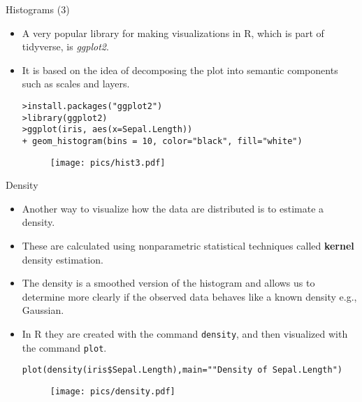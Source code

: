 \documentclass[handout]{beamer}
\begin{document}
\begin{frame}[fragile]{Histograms (3) }
\scriptsize{
\begin{itemize}
 \item A very popular library for making visualizations in R, which is part of tidyverse, is \emph{ggplot2}.
 \item It is based on the idea of decomposing the plot into semantic components such as scales and layers.
 \begin{verbatim}
>install.packages("ggplot2")
>library(ggplot2)
>ggplot(iris, aes(x=Sepal.Length)) 
+ geom_histogram(bins = 10, color="black", fill="white")
 \end{verbatim}
 \begin{figure}[h!]
	\centering
	\texttt{[image: pics/hist3.pdf]}
	
	
\end{figure} 

\end{itemize}

}
\end{frame}


\begin{frame}[fragile]{Density}
\scriptsize{
\begin{itemize}
 \item Another way to visualize how the data are distributed is to estimate a density.
 \item These are calculated using nonparametric statistical techniques called \textbf{kernel} density estimation.
 \item The density is a smoothed version of the histogram and allows us to determine more clearly if the observed data behaves like a known density e.g., Gaussian.  
 \item In R they are created with the command \verb+density+, and then visualized with the command \verb+plot+.

 \begin{verbatim}
plot(density(iris$Sepal.Length),main=""Density of Sepal.Length")
 \end{verbatim}
 \begin{figure}[h!]
	\centering
	\texttt{[image: pics/density.pdf]}
	
	
\end{figure} 

\end{itemize}




}
\end{frame}
\end{document}
